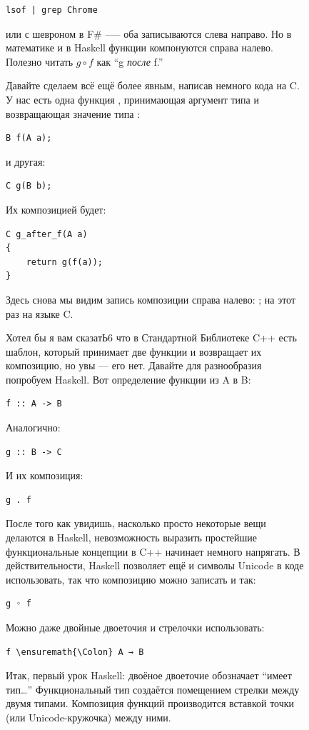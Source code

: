 \begin{figure}
\begin{Verbatim}
lsof | grep Chrome
\end{Verbatim}
или с шевроном \code{>>} в F\# —-- оба записываются слева направо.
Но в математике и в Haskell функции компонуются справа налево.
Полезно читать \(g \circ f\) как ``g \emph{после} f.''

Давайте сделаем всё ещё более явным, написав немного кода на C. У нас есть одна
функция , принимающая аргумент типа  и возвращающая значение типа :

\begin{Verbatim}
B f(A a);
\end{Verbatim}
и другая:

\begin{Verbatim}
C g(B b);
\end{Verbatim}
Их композицией будет:

\begin{Verbatim}
C g_after_f(A a)
{
    return g(f(a));
}
\end{Verbatim}
Здесь снова мы видим запись композиции справа налево: ; на этот раз на языке C.

Хотел бы я вам сказатЬ6 что в Стандартной Библиотеке C++ есть шаблон,
который принимает две функции и возвращает их композицию, но увы --- его нет.
Давайте для разнообразия попробуем Haskell. Вот определение функции из A в B:

\begin{Verbatim}
f :: A -> B
\end{Verbatim}
Аналогично:

\begin{Verbatim}
g :: B -> C
\end{Verbatim}
И их композиция:

\begin{Verbatim}
g . f
\end{Verbatim}
После того как увидишь, насколько просто некоторые вещи делаются в Haskell,
невозможность выразить простейшие функциональные концепции в C++ начинает немного напрягать.
В действительности, Haskell позволяет ещё и символы Unicode в коде использовать, так что
композицию можно записать и так:

\begin{Verbatim}
g ◦ f
\end{Verbatim}
Можно даже двойные двоеточия и стрелочки использовать:

\begin{Verbatim}[commandchars=\\\{\}]
f \ensuremath{\Colon} A → B
\end{Verbatim}
Итак, первый урок Haskell: двоёное двоеточие обозначает ``имеет тип\ldots{}''
Функциональный тип создаётся помещением стрелки между двумя типами. Композиция функций
производится вставкой точки (или Unicode-кружочка) между ними.


\end{figure}

